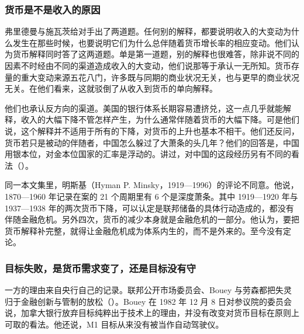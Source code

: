 \subsubsection{货币是不是收入的原因}

弗里德曼与施瓦茨给对手出了两道题\cite{friedmanschwartz1963}。任何别的解释，都要说明收入的大变动为什么发生在那些时候，也要说明它们为什么总伴随着货币增长率的相应变动\cite{friedmanschwartz1963}。他们认为货币解释同时答了这两道题\cite{friedmanschwartz1963}。单是第一道题，别的解释也很难答，除非说不同的因素不时经由不同的渠道造成收入的大变动，他们说那等于承认一无所知\cite{friedmanschwartz1963}。货币存量的重大变动来源五花八门，许多既与同期的商业状况无关，也与更早的商业状况无关\cite{friedmanschwartz1963}。在他们看来，这就驳倒了从收入到货币的单向解释\cite{friedmanschwartz1963}。

他们也承认反方向的渠道。美国的银行体系长期容易遭挤兑，这一点几乎就能解释，收入的大幅下降不管怎样产生，为什么通常伴随着货币的大幅下降\cite{friedmanschwartz1963}。可是他们说，这个解释并不适用于所有的下降，对货币的上升也基本不相干\cite{friedmanschwartz1963}。他们还反问，货币若只是被动的伴随者，中国怎么躲过了大萧条的头几年？他们的回答是，中国用银本位，对金本位国家的汇率是浮动的\cite{friedmanschwartz1963}。讲过，对中国的这段经历另有不同的看法（）。

同一本文集里，明斯基（Hyman P. Minsky，1919—1996）的评论不同意\cite{friedmanschwartz1963,loc45,gnd45}。他说，1870—1960 年记录在案的 21 个周期里有 6 个是深度萧条\cite{friedmanschwartz1963}。其中 1919—1920 年与 1937—1938 年的两次货币下降，可以认定是联邦储备的具体行动造成的，都没有伴随金融危机\cite{friedmanschwartz1963}。另外四次，货币的减少本身就是金融危机的一部分\cite{friedmanschwartz1963}。他认为，要把货币解释补完整，就得让金融危机成为体系内生的，而不是外来的\cite{friedmanschwartz1963}。至今没有定论。

\subsubsection{目标失败，是货币需求变了，还是目标没有守}

一方的理由来自央行自己的记录。联邦公开市场委员会、Bouey 与劳森都把失灵归于金融创新与管制的放松（）。Bouey 在 1982 年 12 月 8 日对参议院的委员会说，加拿大银行放弃目标纯粹出于技术上的理由，并没有改变对货币目标在原则上可取的看法\cite{bouey1982b}。他还说，M1 目标从来没有被当作自动驾驶仪\cite{bouey1982b}。

